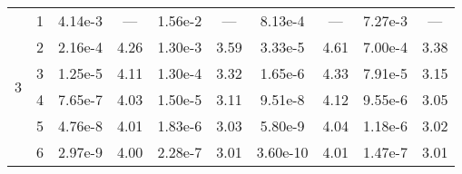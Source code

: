 \begin{table}
{\begin{tabular}{l c c c c c c c c c}
\midrule
\multirow{6}{*}{3}
 & 1 & 4.14e-3 & --- & 1.56e-2 & --- & 8.13e-4 & --- & 7.27e-3 & --- \\ 
 & 2 & 2.16e-4 & 4.26 & 1.30e-3 & 3.59 & 3.33e-5 & 4.61 & 7.00e-4 & 3.38 \\ 
 & 3 & 1.25e-5 & 4.11 & 1.30e-4 & 3.32 & 1.65e-6 & 4.33 & 7.91e-5 & 3.15 \\ 
 & 4 & 7.65e-7 & 4.03 & 1.50e-5 & 3.11 & 9.51e-8 & 4.12 & 9.55e-6 & 3.05 \\ 
 & 5 & 4.76e-8 & 4.01 & 1.83e-6 & 3.03 & 5.80e-9 & 4.04 & 1.18e-6 & 3.02 \\ 
 & 6 & 2.97e-9 & 4.00 & 2.28e-7 & 3.01 & 3.60e-10 & 4.01 & 1.47e-7 & 3.01 \\ 

        \bottomrule
    \end{tabular}}
\end{table}
